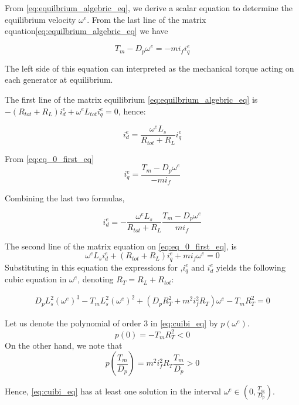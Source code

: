 \documentclass[conference]{IEEEtran}
\begin{document}
From \eqref{eq:equilbrium_algebric_eq}, we derive a scalar
equation to determine the equilibrium velocity $\omega^{e}$.
From the last line of the matrix equation\eqref{eq:equilbrium_algebric_eq} we have

\begin{equation}
T_{m}-D_{p}\omega^{e}=-mi_{f}i_{q}^{e}\label{eq:eq_0_first_eq}
\end{equation}

The left side of this equation can interpreted as the  mechanical torque acting on each
generator at equilibrium.

The first line of the matrix equilibrium \eqref{eq:equilbrium_algebric_eq}
is $-\left(R_{tot}+R_{L}\right)i_{d}^{e}+\omega^{e}L_{tot}i_{q}^{e}=0$,
hence:

\[
i_{d}^{e}=\frac{\omega^{e}L_{s}}{R_{tot}+R_{L}}i_{q}^{e}
\]

From \eqref{eq:eq_0_first_eq} 
\begin{equation}
i_{q}^{e}=\frac{T_{m}-D_{p}\omega^{e}}{-mi_{f}}\label{eq:iq_0_}
\end{equation}

Combining the last two formulas,

\begin{equation}
i_{d}^{e}=-\frac{\omega^{e}L_{s}}{R_{tot}+R_{L}}\frac{T_{m}-D_{p}\omega^{e}}{mi_{f}}\label{eq:id_0_}
\end{equation}

The second line of the matrix equation on \eqref{eq:eq_0_first_eq},
is 
$$\omega^{e}L_{s}i_{d}^{e}+\left(R_{tot}+R_{L}\right)i_{q}^{e}+mi_{f}\omega^{e}=0$$
Substituting in this equation the expressions for ,$i_{q}^{e}$ and $i_{d}^{e}$ yields the following cubic equation in $\omega^e$, denoting $R_T = R_L+R_{tot}$:

\begin{equation}
\begin{split}
D_{p}L_{s}^{2}\left(\omega^{e}\right)^{3}-T_{m}L_{s}^{2}\left(\omega^{e}\right)^{2} +\left(D_{p}R_T^{2}+m^{2}i_{f}^{2}R_T\right) \omega^{e}  -T_{m}R_T^{2}=0
\end{split}\label{eq:cuibi_eq}
\end{equation}

Let us denote the polynomial of order 3 in \eqref{eq:cuibi_eq} by
$p(\omega^{e})$. 
$$p(0)=-T_{m}R_T^{2}<0$$
On the other hand, we note that 
$$
p(\frac{T_{m}}{D_{p}}) =m^{2}i_{f}^{2}R_T\frac{T_{m}}{D_{p}}>0
$$

Hence, \eqref{eq:cuibi_eq} has at least one solution in the interval
$\omega^{e}\in\left(0,\frac{T_{m}}{D_{p}}\right)$.
\end{document}

